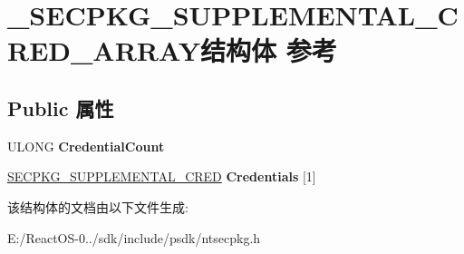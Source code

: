 \hypertarget{struct___s_e_c_p_k_g___s_u_p_p_l_e_m_e_n_t_a_l___c_r_e_d___a_r_r_a_y}{}\section{\+\_\+\+S\+E\+C\+P\+K\+G\+\_\+\+S\+U\+P\+P\+L\+E\+M\+E\+N\+T\+A\+L\+\_\+\+C\+R\+E\+D\+\_\+\+A\+R\+R\+A\+Y结构体 参考}
\label{struct___s_e_c_p_k_g___s_u_p_p_l_e_m_e_n_t_a_l___c_r_e_d___a_r_r_a_y}
\subsection*{Public 属性}
\begin{DoxyCompactItemize}
\item 
\mbox{\label{struct___s_e_c_p_k_g___s_u_p_p_l_e_m_e_n_t_a_l___c_r_e_d___a_r_r_a_y_a8f5c393278f94b8ada50a16279677b90}} 
U\+L\+O\+NG {\bfseries Credential\+Count}
\item 
\mbox{\label{struct___s_e_c_p_k_g___s_u_p_p_l_e_m_e_n_t_a_l___c_r_e_d___a_r_r_a_y_a40eed2750a8368d9cebfc5a98a5c4e50}} 
\hyperlink{struct___s_e_c_p_k_g___s_u_p_p_l_e_m_e_n_t_a_l___c_r_e_d}{S\+E\+C\+P\+K\+G\+\_\+\+S\+U\+P\+P\+L\+E\+M\+E\+N\+T\+A\+L\+\_\+\+C\+R\+ED} {\bfseries Credentials} \mbox{[}1\mbox{]}
\end{DoxyCompactItemize}


该结构体的文档由以下文件生成\+:\begin{DoxyCompactItemize}
\item 
E\+:/\+React\+O\+S-\/0../sdk/include/psdk/ntsecpkg.\+h\end{DoxyCompactItemize}
